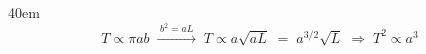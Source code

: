 \documentclass[border=8pt]{standalone}
\begin{document}
\begin{varwidth}{40em}
\LARGE\bfseries
\[ \,T \propto \pi a b\;\xrightarrow{\;b^2=aL\;}\;T \propto a\sqrt{aL}\;=\;a^{3/2}\sqrt{L}\;\Longrightarrow\;T^2 \propto a^3\, \]
\end{varwidth}
\end{document}
